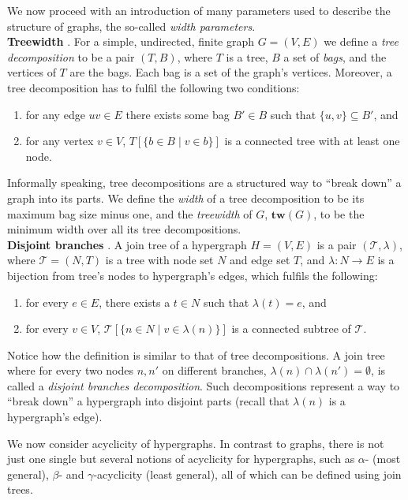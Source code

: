 \documentclass{article}
\begin{document}
We now proceed with an introduction of many parameters used to describe the structure of graphs, the so-called {\em width parameters}. \\

\noindent
\textbf{Treewidth} \cite{DBLP:conf/sat/GanianS17}.
For a simple, undirected, finite graph $G = (V,E)$ we define a {\em tree decomposition} to be a pair $(T, B)$, where $T$ is a tree, $B$ a set of {\em bags}, and the vertices of $T$ are the bags.
Each bag is a set of the graph's vertices.
Moreover, a tree decomposition has to fulfil the following two conditions:
\begin{enumerate}
	\item for any edge $uv\in E$ there exists some bag $B' \in B$ such that $\{u,v\} \subseteq B'$, and
	\item for any vertex $v\in V$, $T[\{ b \in B \; | \; v \in b \}]$ is a connected tree with at least one node.
\end{enumerate}
Informally speaking, tree decompositions are a structured way to ``break down'' a graph into its parts.
We define the {\em width} of a tree decomposition to be its maximum bag size minus one, and the {\em treewidth} of $G$, $\textbf{tw}(G)$, to be the minimum width over all its tree decompositions.\\

\noindent 
\textbf{Disjoint branches} \cite{DBLP:conf/sat/CapelliDM14}.
A join tree of a hypergraph $H=(V,E)$ is a pair $(\mathcal{T}, \lambda)$, where $\mathcal{T}=(N,T)$ is a tree with node set $N$ and edge set $T$, and $\lambda : N \rightarrow E$ is a bijection from tree's nodes to hypergraph's edges, which fulfils the following:
\begin{enumerate}
	\item for every $e\in E$, there exists a $t\in N$ such that $\lambda(t)=e$, and
	\item for every $v\in V$, $\mathcal{T}[\{ n \in N \; | \; v \in \lambda(n) \}]$ is a connected subtree of $\mathcal{T}$.
\end{enumerate}
Notice how the definition is similar to that of tree decompositions.
A join tree where for every two nodes $n, n'$ on different branches, $\lambda(n) \cap \lambda(n') = \emptyset$, is called a {\em disjoint branches decomposition}. 
Such decompositions represent a way to ``break down'' a hypergraph into disjoint parts (recall that $\lambda(n)$ is a hypergraph's edge).

We now consider acyclicity of hypergraphs.
In contrast to graphs, there is not just one single but several notions of acyclicity for hypergraphs, such as $\alpha$- (most general), $\beta$- and $\gamma$-acyclicity (least general), all of which can be defined using join trees.
\end{document}
